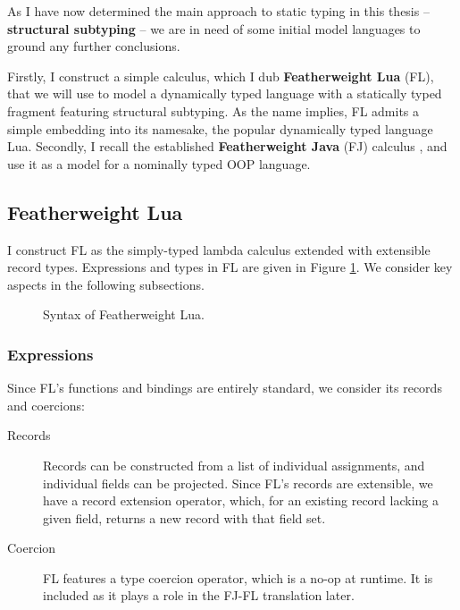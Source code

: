 As I have now determined the main approach to static typing in this thesis -- \textbf{structural subtyping} -- we are in need of some initial model languages to ground any further conclusions.

Firstly, I construct a simple calculus, which I dub \textbf{Featherweight Lua} (FL), that we will use to model a dynamically typed language with a statically typed fragment featuring structural subtyping. As the name implies, FL admits a simple embedding into its namesake, the popular dynamically typed language Lua. Secondly, I recall the established \textbf{Featherweight Java} (FJ) calculus \cite{featherweight-java}, and use it as a model for a nominally typed OOP language.  

\subsection{Featherweight Lua}
\label{subsec:featherweight-lua}

I construct FL as the simply-typed lambda calculus extended with extensible record types. Expressions and types in FL are given in Figure \ref{fig:featherweight-lua-grammar}. We consider key aspects in the following subsections.

\begin{figure}
    \centering
    
    \caption{Syntax of Featherweight Lua.}
    \label{fig:featherweight-lua-grammar}
\end{figure}

\subsubsection{Expressions}

Since FL's functions and bindings are entirely standard, we consider its records and coercions:
\begin{description}
    \item[Records] Records can be constructed from a list of individual assignments, and individual fields can be projected. Since FL's records are extensible, we have a record extension operator, which, for an existing record lacking a given field, returns a new record with that field set.
    \item[Coercion] FL features a type coercion operator, which is a no-op at runtime. It is included as it plays a role in the FJ-FL translation later.
\end{description}

